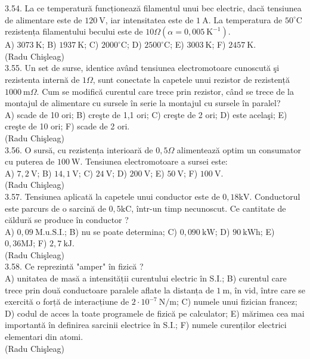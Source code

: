 3.54. La ce temperatură funcționează filamentul unui bec electric, dacă tensiunea de alimentare este de $120 \mathrm{~V}$, iar intensitatea este de $1 \mathrm{~A}$. La temperatura de $50^{\circ} \mathrm{C}$ rezistența filamentului becului este de $10 \Omega\left(\alpha=0,005 \mathrm{~K}^{-1}\right)$.\\ A) $3073 \mathrm{~K}$; B) $1937 \mathrm{~K}$; C) $2000^{\circ} \mathrm{C}$; D) $2500^{\circ} \mathrm{C}$; E) $3003 \mathrm{~K}$; F) $2457 \mathrm{~K}$.\\ (Radu Chişleag)\\

3.55. Un set de surse, identice având tensiunea electromotoare cunoscută şi rezistenta internă de $1 \Omega$, sunt conectate la capetele unui rezistor de rezistență $1000 \mathrm{~m} \Omega$. Cum se modifică curentul care trece prin rezistor, când se trece de la montajul de alimentare cu sursele în serie la montajul cu sursele în paralel?\\ A) scade de 10 ori; B) creşte de 1,1 ori; C) creşte de 2 ori; D) este acelaşi; E) creşte de 10 ori; F) scade de 2 ori.\\ (Radu Chişleag)\\

3.56. O sursă, cu rezistența interioară de $0,5 \Omega$ alimentează optim un consumator cu puterea de $100 \mathrm{~W}$. Tensiunea electromotoare a sursei este:\\ A) $7,2 \mathrm{~V}$; B) $14,1 \mathrm{~V}$; C) $24 \mathrm{~V}$; D) $200 \mathrm{~V}$; E) $50 \mathrm{~V}$; F) $100 \mathrm{~V}$.\\ (Radu Chişleag)\\

3.57. Tensiunea aplicată la capetele unui conductor este de $0,18 \mathrm{kV}$. Conductorul este parcurs de o sarcină de $0,5 \mathrm{kC}$, într-un timp necunoscut. Ce cantitate de căldură se produce în conductor ?\\ A) $0,09 \mathrm{~M.u.S.I.}$; B) nu se poate determina; C) $0,090 \mathrm{~kW}$; D) $90 \mathrm{~kWh}$; E) $0,36 \mathrm{MJ}$; F) $2,7 \mathrm{~kJ}$.\\ (Radu Chişleag)\\

3.58. Ce reprezintă "amper" în fizică ?\\ A) unitatea de masă a intensității curentului electric în S.I.; B) curentul care trece prin două conductoare paralele aflate la distanța de $1 \mathrm{~m}$, în vid, între care se exercită o forță de interacțiune de $2 \cdot 10^{-7} \mathrm{~N} / \mathrm{m}$; C) numele unui fizician francez; D) codul de acces la toate programele de fizică pe calculator; E) mărimea cea mai importantă în definirea sarcinii electrice în S.I.; F) numele curenților electrici elementari din atomi.\\ (Radu Chişleag)\\

